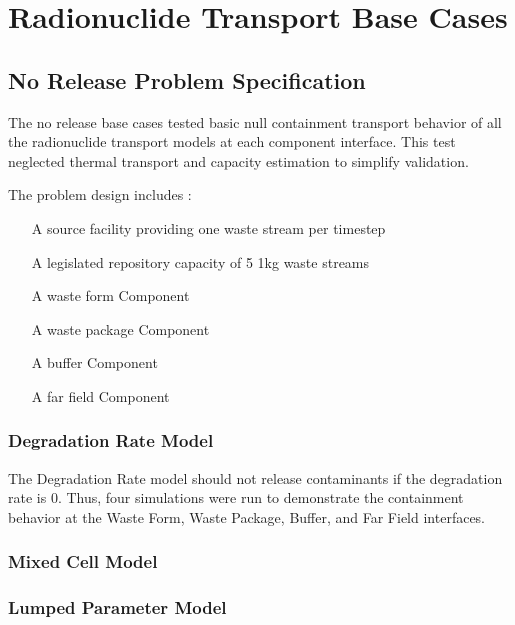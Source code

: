\section{Radionuclide Transport Base Cases}\label{sec:nuclide_base_cases}
\subsection{No Release Problem Specification}
The no release base cases tested basic null containment transport behavior of 
all the radionuclide transport models at each component interface. This test 
neglected thermal transport and capacity estimation to simplify validation. 

The problem design includes : 
\begin{itemize}
\item[A source facility providing one waste stream per timestep]
\item[A legislated repository capacity of 5 1kg waste streams]
\item[A waste form Component] 
\item[A waste package Component]
\item[A buffer Component]
\item[A far field Component]
\end{itemize}

\subsubsection{Degradation Rate Model}
The Degradation Rate model should not release contaminants if the degradation 
rate is 0. Thus, four simulations were run to demonstrate the containment 
behavior at the Waste Form, Waste Package, Buffer, and Far Field interfaces. 



\subsubsection{Mixed Cell Model}



\subsubsection{Lumped Parameter Model}



